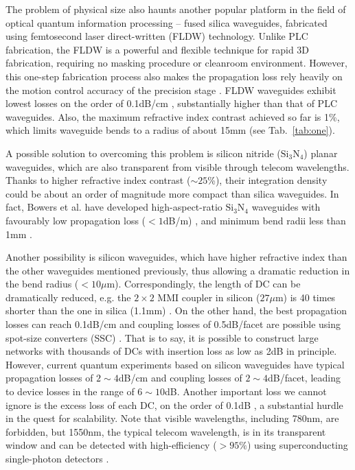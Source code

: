 \documentclass[aps,rmp,twocolumn,amsmath,amssymb,nofootinbib,superscriptaddress]{revtex4}
\newcommand{\comment}[1]{{\color{blue}{#1}}}
\begin{document}
The problem of physical size \comment{???} also haunts another popular platform in the field of optical quantum information processing -- fused silica waveguides, fabricated using femtosecond laser direct-written (FLDW) technology. Unlike PLC fabrication, the FLDW is a powerful and flexible technique for rapid 3D fabrication, requiring no masking procedure or cleanroom environment. However, this one-step fabrication process also makes the propagation loss rely heavily on the motion control accuracy of the precision stage \cite{bib:63}. FLDW waveguides exhibit lowest losses on the order of 0.1dB/cm \cite{bib:63}, substantially higher than that of PLC waveguides. Also, the maximum refractive index contrast achieved so far is 1\%, which limits waveguide bends to a radius of about 15mm (see Tab.~\ref{tab:one}).

A possible solution to overcoming this problem is silicon nitride ($\mathrm{Si}_3\mathrm{N}_4$) planar waveguides, which are also transparent from visible through telecom wavelengths. Thanks to higher refractive index contrast ($\sim 25$\%), their integration density could be about an order of magnitude more compact than silica waveguides. In fact, Bowers et al. have developed high-aspect-ratio $\mathrm{Si}_3\mathrm{N}_4$ waveguides with favourably low propagation loss ($<1$dB/m) \cite{bib:64}, and minimum bend radii less than 1mm \cite{bib:65}.

Another possibility is silicon waveguides, which have higher refractive index than the other waveguides mentioned previously, thus allowing a dramatic reduction in the bend radius ($<10\mu\mathrm{m}$). Correspondingly, the length of DC can be dramatically reduced, e.g. the $2\times 2$ MMI coupler in silicon ($27\mu\mathrm{m}$) \cite{bib:66} is 40 times shorter than the one in silica (1.1mm) \cite{bib:67}. On the other hand, the best propagation losses can reach 0.1dB/cm \cite{bib:68, bib:69} and coupling losses of 0.5dB/facet are possible using spot-size converters (SSC) \cite{bib:70, bib:71}. That is to say, it is possible to construct large networks with thousands of DCs with insertion loss as low as 2dB in principle. However, current quantum experiments based on silicon waveguides \cite{bib:43, bib:72} have typical propagation losses of $2\sim 4$dB/cm and coupling losses of $2\sim 4$dB/facet, leading to device losses in the range of $6\sim 10$dB. Another important loss we cannot ignore is the excess loss of each DC, on the order of 0.1dB \cite{bib:72, bib:73, bib:74}, a substantial hurdle in the quest for scalability. Note that visible wavelengths, including 780nm, are forbidden, but 1550nm, the typical telecom wavelength, is in its transparent window and can be detected with high-efficiency ($>95\%$) using superconducting single-photon detectors \cite{bib:75}.
\end{document}
